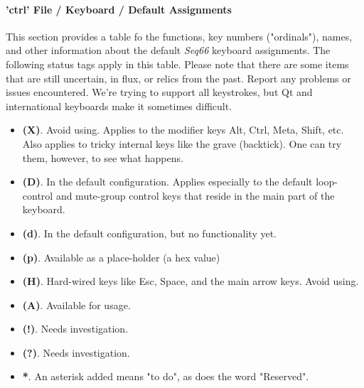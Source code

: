 %
%
%

\paragraph{'ctrl' File / Keyboard / Default Assignments}
\label{paragraph:ctrl_keyboard_default_assignments}

This section provides a table fo the functions, key numbers ("ordinals"),
names, and other information about the default \textsl{Seq66}
keyboard assignments.
The following status tags apply in this table.
Please note that there are some items that are still uncertain, in flux, or
relics from the past.  Report any problems or issues encountered.
We're trying to support all keystrokes, but Qt and international keyboards make
it sometimes difficult.

   \begin{itemize}
      \item \textbf{(X)}.
         Avoid using.  Applies to the modifier keys Alt, Ctrl, Meta, Shift, etc.
         Also applies to tricky internal keys like the grave (backtick).
         One can try them, however, to see what happens.
      \item \textbf{(D)}.
         In the default configuration. Applies especially to the default
         loop-control and mute-group control keys that reside in the main part of
         the keyboard.
      \item \textbf{(d)}.
         In the default configuration, but no functionality yet.
      \item \textbf{(p)}.
         Available as a place-holder (a hex value)
      \item \textbf{(H)}.
         Hard-wired keys like Esc, Space, and the main arrow keys.  Avoid using.
      \item \textbf{(A)}.
         Available for usage.
      \item \textbf{(!)}.
         Needs investigation.
      \item \textbf{(?)}.
         Needs investigation.
      \item \textbf{*}. An asterisk added means "to do", as does the word
         "Reserved".
   \end{itemize}

